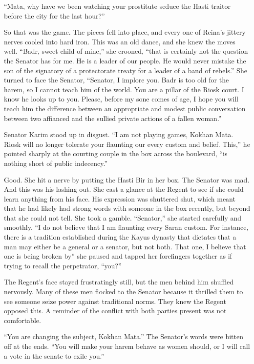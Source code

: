 \documentclass{article}
\begin{document}
	“Mata, why have we been watching your prostitute seduce the Hasti traitor before the city for the last hour?”
	
	So that was the game. The pieces fell into place, and every one of Reina’s jittery nerves cooled into hard iron. This was an old dance, and she knew the moves well. “Badr, sweet child of mine,” she crooned, “that is certainly not the question the Senator has for me. He is a leader of our people. He would never mistake the son of the signatory of a protectorate treaty for a leader of a band of rebels.” She turned to face the Senator, “Senator, I implore you. Badr is too old for the harem, so I cannot teach him of the world. You are a pillar of the Riosk court. I know he looks up to you. Please, before my sone comes of age, I hope you will teach him the difference between an appropriate and modest public conversation between two affianced and the sullied private actions of a fallen woman.” 
	
	Senator Karim stood up in disgust. “I am not playing games, Kokhan Mata. Riosk will no longer tolerate your flaunting our every custom and belief. This,” he pointed sharply at the courting couple in the box across the boulevard, “is nothing short of public indecency.”
	
	
	Good. She hit a nerve by putting the Hasti Bir in her box. The Senator was mad. And this was his lashing out.  She cast a glance at the Regent to see if she could learn anything from his face. His expression was shuttered shut, which meant that he had likely had strong words with someone in the box recently, but beyond that she could not tell. She took a gamble. “Senator,” she started carefully and smoothly. “I do not believe that I am flaunting every Saran custom. For instance, there is a tradition established during the Kayus dynasty that dictates that a man may either be a general or a senator, but not both. That one, I believe that one is being broken by” she paused and tapped her forefingers together as if trying to recall the perpetrator, “you?”
	
	The Regent’s face stayed frustratingly still, but the men behind him shuffled nervously. Many of these men flocked to the Senator because it thrilled them to see someone seize power against traditional norms. They knew the Regent opposed this. A reminder of the conflict with both parties present was not comfortable.
	
	“You are changing the subject, Kokhan Mata.” The Senator’s words were bitten off at the ends. “You will make your harem behave as women should, or I will call a vote in the senate to exile you.” 
	
\end{document}
